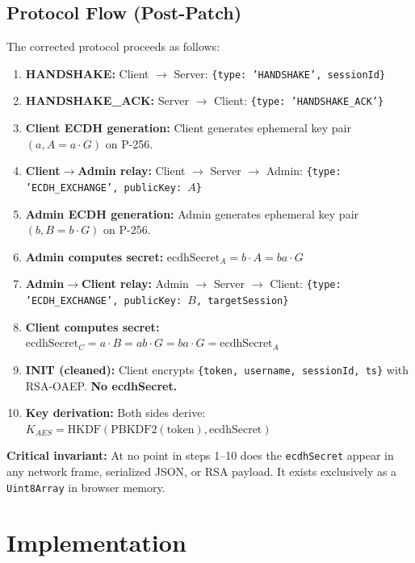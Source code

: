 \documentclass[12pt,a4paper]{article}
\begin{document}
\subsection{Protocol Flow (Post-Patch)}

The corrected protocol proceeds as follows:

\begin{enumerate}
    \item \textbf{HANDSHAKE:} Client $\rightarrow$ Server: \texttt{\{type: 'HANDSHAKE', sessionId\}}
    \item \textbf{HANDSHAKE\_ACK:} Server $\rightarrow$ Client: \texttt{\{type: 'HANDSHAKE\_ACK'\}}
    \item \textbf{Client ECDH generation:} Client generates ephemeral key pair $(a, A = a \cdot G)$ on P-256.
    \item \textbf{Client$\rightarrow$Admin relay:} Client $\rightarrow$ Server $\rightarrow$ Admin: \texttt{\{type: 'ECDH\_EXCHANGE', publicKey: $A$\}}
    \item \textbf{Admin ECDH generation:} Admin generates ephemeral key pair $(b, B = b \cdot G)$ on P-256.
    \item \textbf{Admin computes secret:} $\text{ecdhSecret}_A = b \cdot A = ba \cdot G$
    \item \textbf{Admin$\rightarrow$Client relay:} Admin $\rightarrow$ Server $\rightarrow$ Client: \texttt{\{type: 'ECDH\_EXCHANGE', publicKey: $B$, targetSession\}}
    \item \textbf{Client computes secret:} $\text{ecdhSecret}_C = a \cdot B = ab \cdot G = ba \cdot G = \text{ecdhSecret}_A$ \checkmark
    \item \textbf{INIT (cleaned):} Client encrypts \texttt{\{token, username, sessionId, ts\}} with RSA-OAEP. \textbf{No ecdhSecret.}
    \item \textbf{Key derivation:} Both sides derive: $K_{AES} = \text{HKDF}(\text{PBKDF2}(\text{token}), \text{ecdhSecret})$
\end{enumerate}

\textbf{Critical invariant:} At no point in steps 1--10 does the \texttt{ecdhSecret} appear in any network frame, serialized JSON, or RSA payload. It exists exclusively as a \texttt{Uint8Array} in browser memory.

\section{Implementation}
\end{document}
